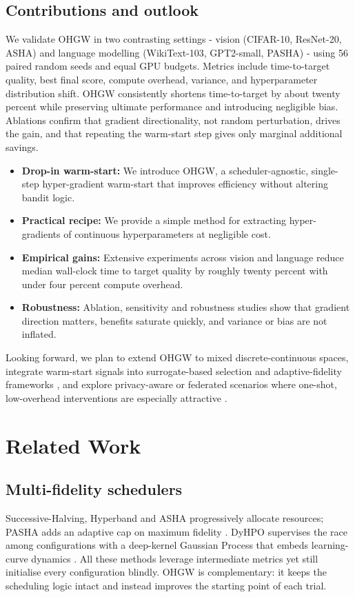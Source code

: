 \documentclass{article} %
\begin{document}
\subsection{Contributions and outlook}
We validate OHGW in two contrasting settings - vision (CIFAR-10, ResNet-20, ASHA) and language modelling (WikiText-103, GPT2-small, PASHA) - using 56 paired random seeds and equal GPU budgets. Metrics include time-to-target quality, best final score, compute overhead, variance, and hyperparameter distribution shift. OHGW consistently shortens time-to-target by about twenty percent while preserving ultimate performance and introducing negligible bias. Ablations confirm that gradient directionality, not random perturbation, drives the gain, and that repeating the warm-start step gives only marginal additional savings.

\begin{itemize}
  \item \textbf{Drop-in warm-start:} We introduce OHGW, a scheduler-agnostic, single-step hyper-gradient warm-start that improves efficiency without altering bandit logic.
  \item \textbf{Practical recipe:} We provide a simple method for extracting hyper-gradients of continuous hyperparameters at negligible cost.
  \item \textbf{Empirical gains:} Extensive experiments across vision and language reduce median wall-clock time to target quality by roughly twenty percent with under four percent compute overhead.
  \item \textbf{Robustness:} Ablation, sensitivity and robustness studies show that gradient direction matters, benefits saturate quickly, and variance or bias are not inflated.
\end{itemize}

Looking forward, we plan to extend OHGW to mixed discrete-continuous spaces, integrate warm-start signals into surrogate-based selection \cite{khazi-2023-deep} and adaptive-fidelity frameworks \cite{jiang-2024-efficient}, and explore privacy-aware or federated scenarios where one-shot, low-overhead interventions are especially attractive \cite{panda-2022-new,khodak-2021-federated}.

\section{Related Work}
\label{sec:related}
\subsection{Multi-fidelity schedulers}
Successive-Halving, Hyperband and ASHA progressively allocate resources; PASHA adds an adaptive cap on maximum fidelity \cite{bohdal-2022-pasha}. DyHPO supervises the race among configurations with a deep-kernel Gaussian Process that embeds learning-curve dynamics \cite{wistuba-2022-supervising}. All these methods leverage intermediate metrics yet still initialise every configuration blindly. OHGW is complementary: it keeps the scheduling logic intact and instead improves the starting point of each trial.
\end{document}
